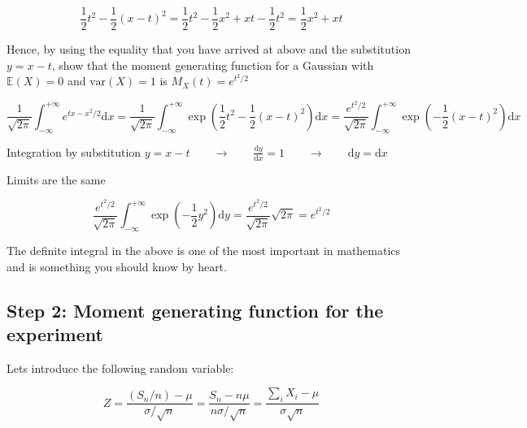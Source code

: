 \documentclass[paper=a4, fontsize=11pt]{scrartcl}
\newcommand{\red}[1]{{\color{red}#1}}
\numberwithin{equation}{section}
\numberwithin{figure}{section}
\numberwithin{table}{section}
\begin{document}
\begin{answers}
\red{
\begin{equation}
\frac{1}{2}t^2 - \frac{1}{2}(x-t)^2 = \frac{1}{2}t^2 - \frac{1}{2} x^2 + xt -
\frac{1}{2}t^2 = \frac{1}{2} x^2 + xt
\end{equation}
}
\end{answers}

\noindent Hence, by using the equality that you have arrived at above and the
substitution $y=x-t$, show that the moment generating function for a Gaussian
with $\mathbb{E}(X)=0$ and $\textrm{var}(X)=1$ is $M_X(t) = e^{t^2/2}$ 

\begin{questions}
\vspace{8cm}
\end{questions}

\begin{answers}
\red{
\begin{equation}
\frac{1}{\sqrt{2\pi}} \int_{-\infty}^{+\infty} e^{tx-x^2/2} \textrm{d}x =
\frac{1}{\sqrt{2\pi}} \int_{-\infty}^{+\infty} \exp\left( \frac{1}{2}t^2 -
\frac{1}{2}(x-t)^2 \right) \textrm{d}x = \frac{ e^{t^2/2} }{\sqrt{2\pi}} 
\int_{-\infty}^{+\infty} \exp\left(- \frac{1}{2}(x-t)^2 \right) \textrm{d}x
\end{equation}

Integration by substitution $y=x-t \qquad \rightarrow \qquad
\frac{\textrm{d}y}{\textrm{d}x} = 1  \qquad \rightarrow \qquad \textrm{d}y =
\textrm{d}x$ 

Limits are the same

\begin{equation}
\frac{ e^{t^2/2} }{\sqrt{2\pi}} \int_{-\infty}^{+\infty} \exp\left(-
\frac{1}{2}y^2 \right) \textrm{d}y = \frac{ e^{t^2/2} }{\sqrt{2\pi}} \sqrt{2\pi}
= e^{t^2/2}
\end{equation}

The definite integral in the above is one of the most important in mathematics
and is something you should know by heart.
}
\end{answers}

\subsection{Step 2: Moment generating function for the experiment}

\noindent Lets introduce the following random variable:

\begin{equation}
 Z = \frac{ (S_n/n) - \mu }{ \sigma /\sqrt{n} } = \frac{ S_n - n\mu}{
n\sigma/\sqrt{n} } = \frac{ \sum_i X_i - \mu }{ \sigma \sqrt{n}}
\end{equation}
\end{document}

